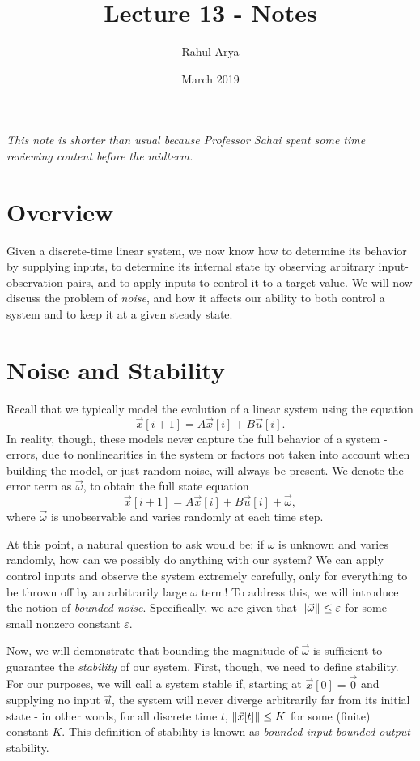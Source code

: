 \documentclass[letterpaper]{article}
\title{Lecture 13 - Notes}
\author{Rahul Arya}
\date{March 2019}
\theoremstyle{remark}
\newcommand{\eps}{{\varepsilon}}    %
\begin{document}
\maketitle

\emph{This note is shorter than usual because Professor Sahai spent some time reviewing content before the midterm.}

\section{Overview}
Given a discrete-time linear system, we now know how to determine its behavior by supplying inputs, to determine its internal state by observing arbitrary input-observation pairs, and to apply inputs to control it to a target value. We will now discuss the problem of \emph{noise}, and how it affects our ability to both control a system and to keep it at a given steady state.

\section{Noise and Stability}
Recall that we typically model the evolution of a linear system using the equation
\[
    \vec{x}[i + 1] = A\vec{x}[i] + B\vec{u}[i].
\]
In reality, though, these models never capture the full behavior of a system - errors, due to nonlinearities in the system or factors not taken into account when building the model, or just random noise, will always be present. We denote the error term as $\vec{\omega}$, to obtain the full state equation
\[
    \vec{x}[i + 1] = A\vec{x}[i] + B\vec{u}[i] + \vec{\omega},
\]
where $\vec{\omega}$ is unobservable and varies randomly at each time step.

At this point, a natural question to ask would be: if $\omega$ is unknown and varies randomly, how can we possibly do anything with our system? We can apply control inputs and observe the system extremely carefully, only for everything to be thrown off by an arbitrarily large $\omega$ term! To address this, we will introduce the notion of \emph{bounded noise}. Specifically, we are given that $\norm{\vec{\omega}} \le \eps$ for some small nonzero constant $\eps$.

Now, we will demonstrate that bounding the magnitude of $\vec{\omega}$ is sufficient to guarantee the \emph{stability} of our system. First, though, we need to define stability. For our purposes, we will call a system stable if, starting at $\vec{x}[0] = \vec{0}$ and supplying no input $\vec{u}$, the system will never diverge arbitrarily far from its initial state - in other words, for all discrete time $t$, $\norm{\vec{x}[t]} \le K$ for some (finite) constant $K$. This definition of stability is known as \emph{bounded-input bounded output} stability.
\end{document}
